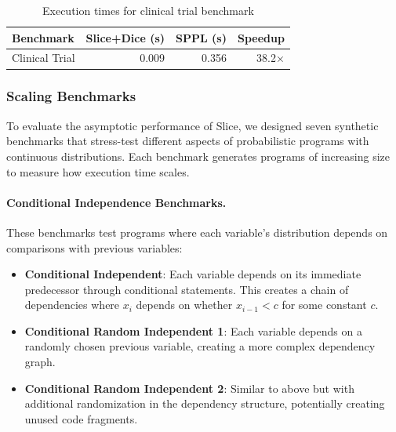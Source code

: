 \begin{table}[!t]
\centering
\caption{Execution times for clinical trial benchmark}
\begin{tabular}{lrrr}
\toprule
Benchmark & Slice+Dice (s) & SPPL (s) & Speedup \\
\midrule
Clinical Trial & 0.009 & 0.356 & 38.2× \\
\bottomrule
\end{tabular}
\end{table}

\subsubsection{Scaling Benchmarks}

To evaluate the asymptotic performance of Slice, we designed seven synthetic benchmarks that stress-test different aspects of probabilistic programs with continuous distributions. Each benchmark generates programs of increasing size to measure how execution time scales.

\paragraph{Conditional Independence Benchmarks.} 
These benchmarks test programs where each variable's distribution depends on comparisons with previous variables:
\begin{itemize}
\item \textbf{Conditional Independent}: Each variable depends on its immediate predecessor through conditional statements. This creates a chain of dependencies where $x_i$ depends on whether $x_{i-1} < c$ for some constant $c$.
\item \textbf{Conditional Random Independent 1}: Each variable depends on a randomly chosen previous variable, creating a more complex dependency graph.
\item \textbf{Conditional Random Independent 2}: Similar to above but with additional randomization in the dependency structure, potentially creating unused code fragments.
\end{itemize}

